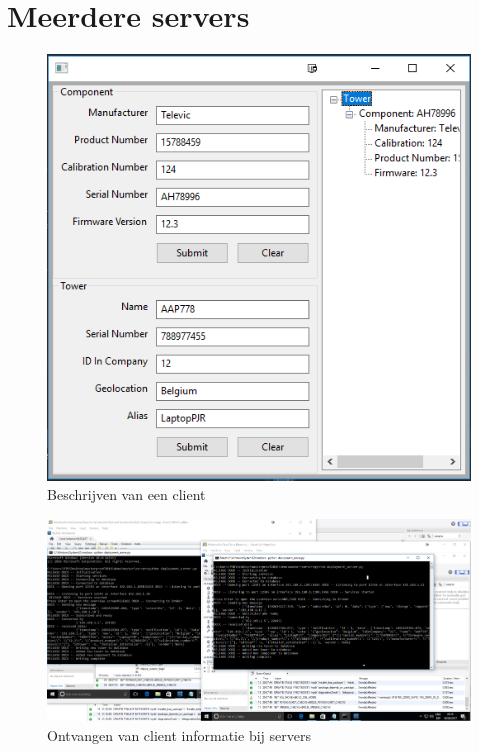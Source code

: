 \section{Meerdere servers}\label{sec:multiserverscreen}
\begin{figure}[!ht]
\centering
\includegraphics[scale=0.9]{afbeelding/testMultiServer/Setup.png}
\caption{Beschrijven van een client}
\label{fig:testServer:setup}
\end{figure}

\begin{figure}
\centering
\includegraphics[width=\textwidth,height=\textheight,keepaspectratio]{afbeelding/testMultiServer/receivedSetup.png}
\caption{Ontvangen van client informatie bij servers}
\label{fig:testServer:receiveSetup}
\end{figure}


